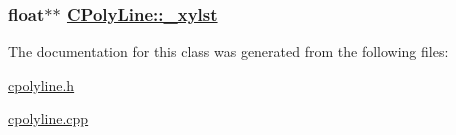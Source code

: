 \hypertarget{classCPolyLine_o2}{
\subsubsection[\_\-xylst]{\setlength{\rightskip}{0pt plus 5cm}float$\ast$$\ast$ \hyperlink{classCPolyLine_o2}{CPoly\-Line::\_\-xylst}}}
\label{classCPolyLine_o2}




The documentation for this class was generated from the following files:\begin{CompactItemize}
\item 
\hyperlink{cpolyline_8h}{cpolyline.h}\item 
\hyperlink{cpolyline_8cpp}{cpolyline.cpp}\end{CompactItemize}
